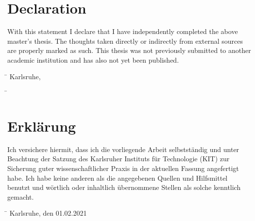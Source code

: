 \ifx\theThesisLanguage\dictThesisLanguageEnglish

\chapter*{Declaration}

With this statement I declare that I have independently completed the above
master's thesis. The thoughts taken directly or indirectly from external
sources are properly marked as such. This thesis was not previously submitted
to another academic institution and has also not yet been published.

\vspace{2cm}
\begin{tabbing}
\hspace{3em}\= \kill
\>Karlsruhe, \theThesisSignatureDate
\end{tabbing}

\vspace{2cm}
\begin{tabbing}
\hspace{3em}\= \kill
\>\theThesisAuthor\\[1ex]
\end{tabbing}

\else

\chapter*{Erkl{\"a}rung}


Ich versichere hiermit,
dass ich die vorliegende Arbeit selbstst{\"a}ndig
und unter Beachtung der Satzung des Karlsruher Instituts f\"ur Technologie (KIT)
zur Sicherung guter wissen\-schaft\-licher Praxis in der aktuellen Fassung angefertigt habe.
Ich habe keine anderen als die angegebenen Quellen und Hilfsmittel benutzt und w{\"o}rtlich oder inhaltlich {\"u}bernommene Stellen als solche kenntlich gemacht.

\vspace{2cm}
\begin{tabbing}
\hspace{3em}\= \kill
\>Karlsruhe, den 01.02.2021\theThesisSignatureDate
\end{tabbing}

